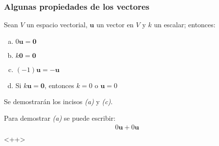 \documentclass[a4paper,12pt]{article}
\begin{document}
\subsubsection{Algunas propiedades de los vectores}

\begin{theorem}
  Sean $V$ un espacio vectorial, $\mathbf{u}$ un vector en $V$ y $k$ un
  escalar; entonces:
  \begin{enumerate}[(a)]
    \item $0\mathbf{u}=\mathbf{0}$
    \item $k\mathbf{0}=\mathbf{0}$
    \item  $(-1)\mathbf{u}=-\mathbf{u}$
    \item Si $k\mathbf{u}=\mathbf{0}$, entonces $k=0$ o $\mathbf{u}=0$
  \end{enumerate}
  \label{theo:prop_vect}
\end{theorem}

\demo Se demostrarán los incisos \emph{(a)} y \emph{(c)}.

Para demostrar \emph{(a)} se puede escribir:
\begin{align*}
  0\mathbf{u}+0\mathbf{u} \\
\end{align*}<++>
\end{document}
